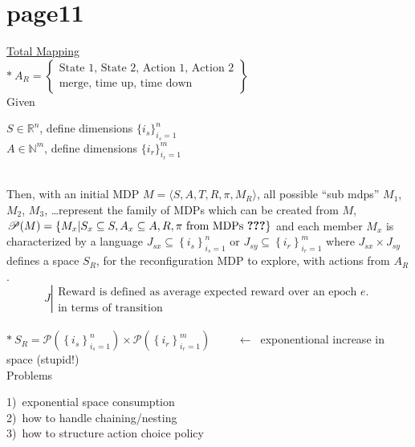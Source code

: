 \section*{page11}

\underline{Total Mapping}\\

 
$\ast\ A_R = \left\{ \begin{array}{l} \text{State 1, State 2, Action 1, Action 2} \\ \text{merge, time up, time down} \end{array} \right\}$\\

Given\ 
\begin{minipage}[t]{0.7\textwidth}
$S\in\mathbb{R}^{n}$, define dimensions $\{i_s\}_{i_s=1}^{n}$ \\
$A\in \mathbb{N}^{m}$, define dimensions $\{i_r\}_{i_r=1}^{m}$
\end{minipage}\\

Then, with an initial MDP $M=\langle S, A, T, R, \pi, M_R \rangle$, all possible ``sub mdps'' $M_1$, $M_2$, $M_3$, \ldots represent the family of MDPs which can be created from $M$, $\mathscr{P}(M)=\left\{M_x | S_x \subseteq S, A_x\subseteq A, R, \pi \text{\ from MDPs \textbf{???}}\right\}$ and each member $M_x$ is characterized by a language $J_{sx}\subseteq \left\{i_s\right\}_{i_s=1}^{n}$ or $J_{sy}\subseteq\left\{i_r\right\}_{i_r=1}^{m}$ where $J_{sx}\times J_{sy}$ defines a space $S_R$, for the reconfiguration MDP to explore, with actions from $A_R$.\\

\begin{equation*}
J \left| \begin{array}{l}\text{Reward is defined as average expected reward over an epoch $e$.} \\ \text{in terms of transition} \end{array} \right.
\end{equation*}\\

$\ast\ S_R = \mathscr{P}\left(\left\{i_s\right\}_{i_s=1}^{n}\right)\times\mathscr{P}\left(\left\{i_r\right\}_{i_r=1}^{m}\right)$
$\qquad\longleftarrow\ $ exponentional increase in space (stupid!)
\\

Problems\ 
\begin{minipage}[t]{0.5\textwidth}
1)\ exponential space consumption\\
2)\ how to handle chaining/nesting\\
3)\ how to structure action choice policy
\end{minipage}